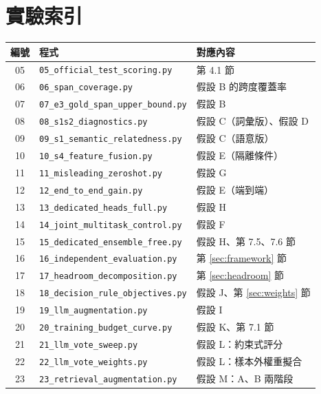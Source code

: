 \documentclass[11pt,a4paper]{ctexart}
\begin{document}
\section{實驗索引}

\begin{table}[h]
\centering\small
\begin{tabular}{@{}clp{6.8cm}@{}}
\toprule
編號 & 程式 & 對應內容 \\
\midrule
05 & \texttt{05\_official\_test\_scoring.py}      & 第 4.1 節 \\
06 & \texttt{06\_span\_coverage.py}               & 假設 B 的跨度覆蓋率 \\
07 & \texttt{07\_e3\_gold\_span\_upper\_bound.py} & 假設 B \\
08 & \texttt{08\_s1s2\_diagnostics.py}            & 假設 C（詞彙版）、假設 D \\
09 & \texttt{09\_s1\_semantic\_relatedness.py}    & 假設 C（語意版） \\
10 & \texttt{10\_s4\_feature\_fusion.py}          & 假設 E（隔離條件） \\
11 & \texttt{11\_misleading\_zeroshot.py}         & 假設 G \\
12 & \texttt{12\_end\_to\_end\_gain.py}           & 假設 E（端到端） \\
13 & \texttt{13\_dedicated\_heads\_full.py}       & 假設 H \\
14 & \texttt{14\_joint\_multitask\_control.py}    & 假設 F \\
15 & \texttt{15\_dedicated\_ensemble\_free.py}    & 假設 H、第 7.5、7.6 節 \\
16 & \texttt{16\_independent\_evaluation.py}      & 第 \ref{sec:framework} 節 \\
17 & \texttt{17\_headroom\_decomposition.py}      & 第 \ref{sec:headroom} 節 \\
18 & \texttt{18\_decision\_rule\_objectives.py}   & 假設 J、第 \ref{sec:weights} 節 \\
19 & \texttt{19\_llm\_augmentation.py}            & 假設 I \\
20 & \texttt{20\_training\_budget\_curve.py}      & 假設 K、第 7.1 節 \\
21 & \texttt{21\_llm\_vote\_sweep.py}              & 假設 L：約束式評分 \\
22 & \texttt{22\_llm\_vote\_weights.py}            & 假設 L：樣本外權重擬合 \\
23 & \texttt{23\_retrieval\_augmentation.py}       & 假設 M：A、B 兩階段 \\

\end{tabular}
\end{table}
\end{document}
